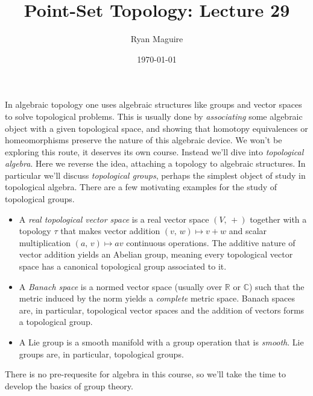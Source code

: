 \documentclass{article}
\title{Point-Set Topology: Lecture 29}
\author{Ryan Maguire}
\date{\today}
\theoremstyle{plain}
\theoremstyle{normal}
\begin{document}
    \maketitle
    In algebraic topology one uses algebraic structures like groups and
    vector spaces to solve topological problems. This is usually done by
    \textit{associating} some algebraic object with a given topological space,
    and showing that homotopy equivalences or homeomorphisms preserve
    the nature of this algebraic device. We won't be exploring this route, it
    deserves its own course. Instead we'll dive into
    \textit{topological algebra}. Here we reverse the idea, attaching a
    topology to algebraic structures. In particular we'll discuss
    \textit{topological groups}, perhaps the simplest object of study in
    topological algebra. There are a few motivating examples for the study of
    topological groups.
    \begin{itemize}
        \item A \textit{real topological vector space} is a real vector space
            $(V,\,+)$ together with a topology $\tau$ that makes vector
            addition $(v,\,w)\mapsto{v+w}$ and scalar multiplication
            $(a,\,v)\mapsto{a}v$ continuous operations. The additive nature of
            vector addition yields an Abelian group, meaning every topological
            vector space has a canonical topological group associated to it.
        \item A \textit{Banach space} is a normed vector space (usually over
            $\mathbb{R}$ or $\mathbb{C}$) such that the metric induced by the
            norm yields a \textit{complete} metric space. Banach spaces are,
            in particular, topological vector spaces and the addition of
            vectors forms a topological group.
        \item A Lie group is a smooth manifold with a group operation that is
            \textit{smooth}. Lie groups are, in particular, topological groups.
    \end{itemize}
    There is no pre-requesite for algebra in this course, so we'll take the
    time to develop the basics of group theory.
\end{document}
